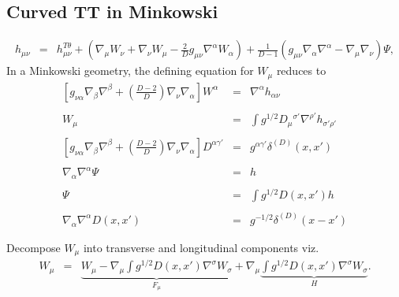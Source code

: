 \documentclass[10pt,letterpaper]{article}
\numberwithin{equation}{section}
\begin{document}
\subsection{Curved TT in Minkowski}
\begin{eqnarray}
h_{\mu\nu} &=& h_{\mu\nu}^{T\theta} + \left(\nabla_\mu W_\nu + \nabla_\nu W_\mu - \frac{2}{D}g_{\mu\nu}\nabla^\alpha W_\alpha\right) +\frac{1}{D-1}\left( g_{\mu\nu}\nabla_\alpha \nabla^\alpha - \nabla_\mu\nabla_\nu\right)\Psi,
\label{hdecomp3}
\end{eqnarray}
In a Minkowski geometry, the defining equation for $W_{\mu}$ reduces to
\begin{eqnarray}
\left[g_{\nu\alpha}\nabla_\beta\nabla^\beta + \left(\frac{D-2}{D}\right)\nabla_\nu \nabla_\alpha\right]W^\alpha
&=& \nabla^\alpha h_{\alpha\nu} 
\\ \nonumber\\
W_{\mu} &=& \int g^{1/2} D_\mu{}^{\sigma'} \nabla^{\rho'} h_{\sigma'\rho'}
\\ \nonumber\\
\left[g_{\nu\alpha}\nabla_\beta\nabla^\beta + \left(\frac{D-2}{D}\right)\nabla_\nu \nabla_\alpha \right]D^{\alpha\gamma'} &=& g^{\alpha\gamma'}  \delta^{(D)}(x,x')
\\ \nonumber\\
\nabla_\alpha\nabla^\alpha \Psi &=& h
\\ \nonumber\\
\Psi &=& \int g^{1/2}D(x,x')h
\\ \nonumber\\
\nabla_\alpha \nabla^\alpha D(x,x') &=& g^{-1/2}\delta^{(D)} (x-x')
\end{eqnarray}

Decompose $W_{\mu}$ into transverse and longitudinal components viz.
\begin{eqnarray}
W_{\mu} &=& \underbrace{W_{\mu} -\nabla_\mu \int g^{1/2} D(x,x')\nabla^{\sigma}W_\sigma}_{F_{\mu}} + \nabla_\mu \underbrace{ \int g^{1/2}D(x,x')\nabla^\sigma W_\sigma}_{H}.
\end{eqnarray}
\end{document}
